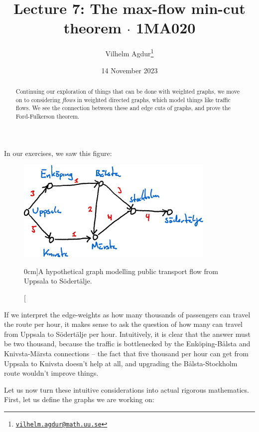 \documentclass[nobib]{tufte-handout}
\title{Lecture 7: The max-flow min-cut theorem $\cdot$ 1MA020}
\author[Vilhelm Agdur]{Vilhelm Agdur\thanks{\href{mailto:vilhelm.agdur@math.uu.se}{\nolinkurl{vilhelm.agdur@math.uu.se}}}}
\date{14 November 2023}
\begin{document}
\maketitle%

\begin{abstract}
\noindent
Continuing our exploration of things that can be done with weighted graphs, we move on to considering \emph{flows} in weighted directed graphs, which model things like traffic flows. We see the connection between these and edge cuts of graphs, and prove the Ford-Fulkerson theorem.
\end{abstract}

In our exercises, we saw this figure:
\begin{figure}
    \centering
    \includegraphics[width=0.85\textwidth]{graphics/L5_exc_MSTs_etc/train_network_flow.png}
    \caption[][0cm]{A hypothetical graph modelling public transport flow from Uppsala to Södertälje.}
    \label{fig:uppsala_stockholm_traffic}
  \end{figure}

  If we interpret the edge-weights as how many thousands of passengers can travel the route per hour, it makes sense to ask the question of how many can travel from Uppsala to Södertälje per hour. Intuitively, it is clear that the answer must be two thousand, because the traffic is bottlenecked by the Enköping-Bålsta and Knivsta-Märsta connections -- the fact that five thousand per hour can get from Uppsala to Knivsta doesn't help at all, and upgrading the Bålsta-Stockholm route wouldn't improve things.

  Let us now turn these intuitive considerations into actual rigorous mathematics. First, let us define the graphs we are working on:
\end{document}
